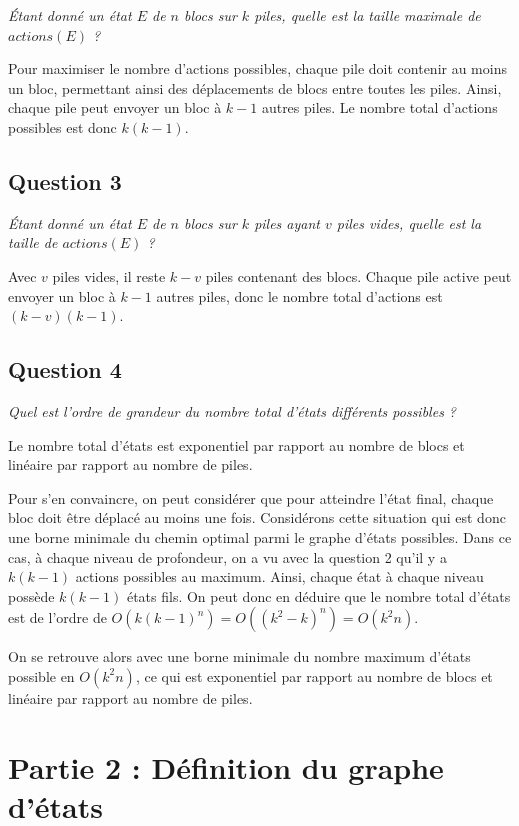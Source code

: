 \textit{Étant donné un état $E$ de $n$ blocs sur $k$ piles, quelle est la taille maximale de $actions(E)$ ?}

Pour maximiser le nombre d'actions possibles, chaque pile doit contenir au moins un bloc, permettant ainsi des déplacements de blocs entre toutes les piles. Ainsi, chaque pile peut envoyer un bloc à $k - 1$ autres piles. Le nombre total d'actions possibles est donc $k(k - 1)$.

\subsection{Question 3}

\textit{Étant donné un état $E$ de $n$ blocs sur $k$ piles ayant $v$ piles vides, quelle est la taille de $actions(E)$ ?}

Avec $v$ piles vides, il reste $k - v$ piles contenant des blocs. Chaque pile active peut envoyer un bloc à $k - 1$ autres piles, donc le nombre total d'actions est $(k-v)(k-1)$.

\subsection{Question 4}\label{q:4}

\textit{Quel est l'ordre de grandeur du nombre total d'états différents possibles ?}

Le nombre total d'états est exponentiel par rapport au nombre de blocs et linéaire par rapport au nombre de piles. 

Pour s'en convaincre, on peut considérer que pour atteindre l'état final, chaque bloc doit être déplacé au moins une fois. Considérons cette situation qui est donc une borne minimale du chemin optimal parmi le graphe d'états possibles. Dans ce cas, à chaque niveau de profondeur, on a vu avec la question 2 qu'il y a $k(k - 1)$ actions possibles au maximum. Ainsi, chaque état à chaque niveau possède $k(k - 1)$ états fils. On peut donc en déduire que le nombre total d'états est de l'ordre de $O(k(k - 1)^n) = O((k^2 - k)^n) = O(k^2n)$.

On se retrouve alors avec une borne minimale du nombre maximum d'états possible en $O(k^2n)$, ce qui est exponentiel par rapport au nombre de blocs et linéaire par rapport au nombre de piles.

\section{Partie 2 : Définition du graphe d'états}

